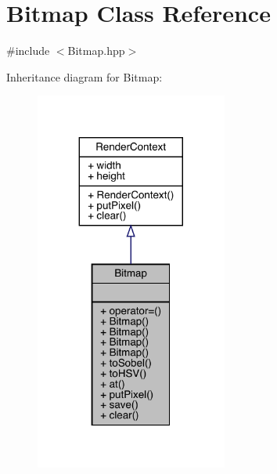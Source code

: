 \hypertarget{class_bitmap}{}\section{Bitmap Class Reference}
\label{class_bitmap}


{\ttfamily \#include $<$Bitmap.\+hpp$>$}



Inheritance diagram for Bitmap\+:\nopagebreak
\begin{figure}[H]
\begin{center}
\leavevmode
\includegraphics[width=179pt]{class_bitmap__inherit__graph}
\end{center}
\end{figure}


